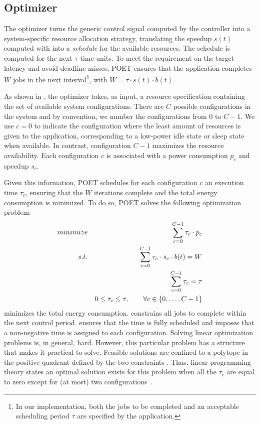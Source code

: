 \subsection{Optimizer}
\label{sec:poet-optimizer}

The optimizer turns the generic control signal computed by the controller into a system-specific resource allocation strategy, translating the speedup $s(t)$ computed with  into a \emph{schedule} for the available resources.
The schedule is computed for the next $\tau$ time units.
To meet the requirement on the target latency and avoid deadline misses, POET ensures that the application completes $W$ jobs in the next interval\footnote{In our implementation, both the jobs to be completed and an acceptable scheduling period $\tau$ are specified by the application.}, with $W = \tau \cdot s(t) \cdot b(t)$.

As shown in , the optimizer takes, as input, a resource specification containing the set of available system configurations.
There are $C$ possible configurations in the system and by convention, we number the configurations from $0$ to $C-1$.
We use $c = 0$ to indicate the configuration where the least amount of resources is given to the application, corresponding to a low-power idle state or sleep state when available.
In contrast, configuration $C-1$ maximizes the resource availability.
Each configuration $c$ is associated with a power consumption $p_c$ and speedup $s_c$.

Given this information, POET schedules for each configuration $c$ an execution time $\tau_c$, ensuring that the $W$ iterations complete and the total energy consumption is minimized. To do so, POET solves the following optimization problem:
\begin{eqnarray}
\minimize && \sum_{c=0}^{C-1} \tau_c \cdot p_c \label{eqn:poet-power} \\
\st %
&& \sum_{c=0}^{C-1} \tau_c \cdot s_c \cdot b(t) =  W \label{eqn:poet-work} \\
&& \sum_{c=0}^{C-1} \tau_c =  \tau \label{eqn:poet-deadline} \\
&& 0 \le \tau_c \le \tau, \qquad \forall c \in \{0,\ldots,C-1\} \label{eqn:poet-time}
\end{eqnarray}
 minimizes the total energy consumption.
 constrains all jobs to complete within the next control period.
 ensures that the time is fully scheduled and  imposes that a non-negative time is assigned to each configuration.
Solving linear optimization problems is, in general, hard.
However, this particular problem has a structure that makes it practical to solve.
Feasible solutions are confined to a polytope in the positive quadrant defined by the two constraints .
Thus, linear programming theory states an optimal solution exists for this problem when all the $\tau_c$ are equal to zero except for (at most) two configurations~\cite{LP}.

